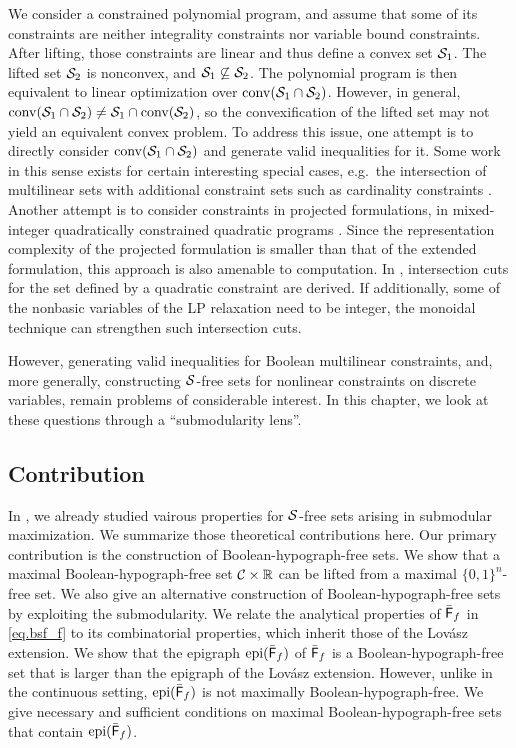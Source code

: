  We consider a constrained polynomial program, and assume that some  of its constraints are neither integrality constraints nor variable bound constraints. After lifting,  those constraints are linear and  thus define a convex set $\mathcal S_1$. The lifted set $\mathcal S_2$ is nonconvex, and $\mathcal S_1 \not\subseteq \mathcal S_2$.  The polynomial program is then equivalent to linear optimization over $\operatorname{conv}(\mathcal S_1 \cap \mathcal S_2)$. However, in general, $\operatorname{conv}(\mathcal S_1 \cap \mathcal S_2) \ne \mathcal S_1 \cap \operatorname{conv}(\mathcal S_2)$, so the convexification of the lifted set may not yield an equivalent convex problem. To address this issue, one attempt is to directly consider $\operatorname{conv}(\mathcal S_1 \cap \mathcal S_2)$ and generate valid inequalities for it.  Some work in this sense exists for certain interesting special cases, e.g.~the intersection of multilinear sets with additional constraint sets such as cardinality constraints \cite{chen2023multilinear}. Another attempt is to consider  constraints in projected formulations, \eg in mixed-integer quadratically constrained quadratic programs \cite{saxena2011convex}. Since the  representation complexity  of the projected formulation  is smaller than that of the  extended formulation, this approach is also amenable to computation. In \cite{chmiela2022implementation,munoz2020maximal}, intersection cuts for the set defined by a quadratic constraint are derived. If additionally, some of the nonbasic variables of the LP relaxation need to be integer, the monoidal technique \cite{ChmielaMunozSerrano2023} can strengthen such intersection cuts.

 
However, generating valid inequalities for Boolean multilinear constraints, and, more generally, constructing $\mathcal S$-free sets for nonlinear constraints on discrete variables, remain problems of considerable interest. In this chapter, we look at these questions through a ``submodularity lens''.


\subsection{Contribution}
In , we already studied vairous properties for $\mathcal S$-free sets arising in submodular maximization. We summarize those theoretical contributions here.
Our primary contribution is the construction of Boolean-hypograph-free sets. We show that a maximal Boolean-hypograph-free set $\mathcal C \times \mathbb R$ can be lifted from  a maximal $\{0,1\}^n$-free set.  We also give an alternative construction of Boolean-hypograph-free sets by exploiting  the submodularity. We relate the analytical properties of  $\bar{\mathsf F}_{f}$ in \eqref{eq.bsf_f} to its combinatorial properties, which inherit those of the Lovász extension. We show that the epigraph $\operatorname{epi}(\bar{\mathsf F}_{f})$ of $\bar{\mathsf F}_{f}$ is a Boolean-hypograph-free set that is  larger than the epigraph of the Lovász extension. However, unlike in the continuous setting, $\operatorname{epi}(\bar{\mathsf F}_{f})$ is not maximally Boolean-hypograph-free. We give necessary and sufficient conditions on maximal  Boolean-hypograph-free sets that contain $\operatorname{epi}(\bar{\mathsf F}_{f})$.

